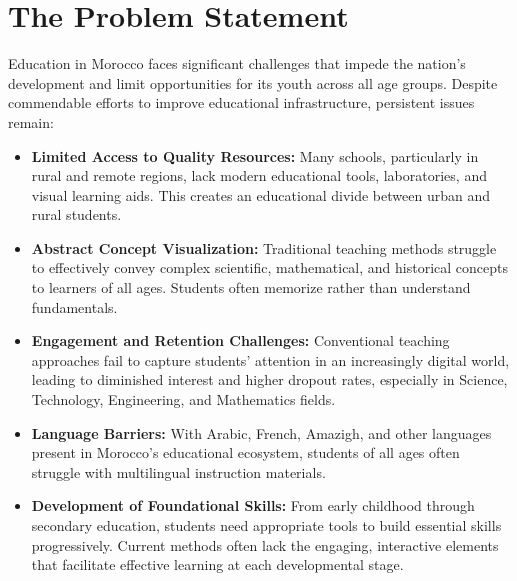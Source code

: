\documentclass[11pt,                                          %
a4paper,                                       %
twoside]{report}                               %
\begin{document}
	\pagestyle{fancy}                                             %
	\chapter{The Problem Statement}              %
	
	Education in Morocco faces significant challenges that impede the nation's development and limit opportunities for its youth across all age groups. Despite commendable efforts to improve educational infrastructure, persistent issues remain:
	
	\begin{itemize}
		\item \textbf{Limited Access to Quality Resources:} Many schools, particularly in rural and remote regions, lack modern educational tools, laboratories, and visual learning aids. This creates an educational divide between urban and rural students.
		
		\item \textbf{Abstract Concept Visualization:} Traditional teaching methods struggle to effectively convey complex scientific, mathematical, and historical concepts to learners of all ages. Students often memorize rather than understand fundamentals.
		
		\item \textbf{Engagement and Retention Challenges:} Conventional teaching approaches fail to capture students' attention in an increasingly digital world, leading to diminished interest and higher dropout rates, especially in Science, Technology, Engineering, and Mathematics fields.
		
		\item \textbf{Language Barriers:} With Arabic, French, Amazigh, and other languages present in Morocco's educational ecosystem, students of all ages often struggle with multilingual instruction materials.
		
		\item \textbf{Development of Foundational Skills:} From early childhood through secondary education, students need appropriate tools to build essential skills progressively. Current methods often lack the engaging, interactive elements that facilitate effective learning at each developmental stage.
	\end{itemize}
	
\end{document}
